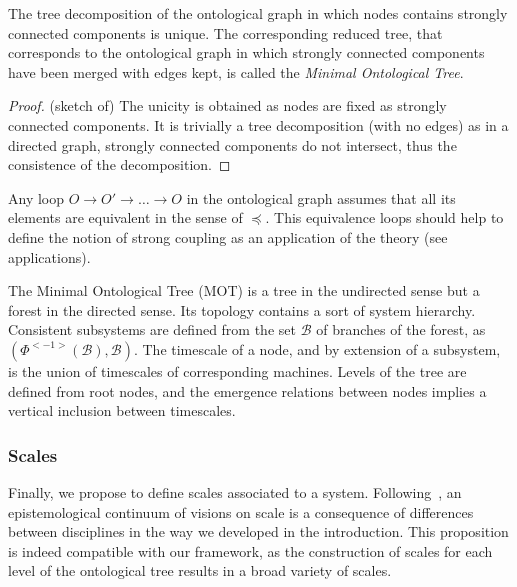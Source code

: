 \begin{proposition}
The tree decomposition of the ontological graph in which nodes contains strongly connected components is unique. The corresponding reduced tree, that corresponds to the ontological graph in which strongly connected components have been merged with edges kept, is called the \emph{Minimal Ontological Tree}.
\end{proposition}

\begin{proof}
(sketch of) The unicity is obtained as nodes are fixed as strongly connected components. It is trivially a tree decomposition (with no edges) as in a directed graph, strongly connected components do not intersect, thus the consistence of the decomposition.
\end{proof}

Any loop $O \rightarrow O' \rightarrow \ldots \rightarrow O$ in the ontological graph assumes that all its elements are equivalent in the sense of $\preccurlyeq$. This equivalence loops should help to define the notion of strong coupling as an application of the theory (see applications).

\medskip

The Minimal Ontological Tree (MOT) is a tree in the undirected sense but a forest in the directed sense. Its topology contains a sort of system hierarchy. Consistent subsystems are defined from the set $\mathcal{B}$ of branches of the forest, as $(\Phi^{<-1>}(\mathcal{B}),\mathcal{B})$. The timescale of a node, and by extension of a subsystem, is the union of timescales of corresponding machines. Levels of the tree are defined from root nodes, and the emergence relations between nodes implies a vertical inclusion between timescales.






\subsubsection*{Scales}

Finally, we propose to define scales associated to a system. Following~\cite{manson2008does}, an epistemological continuum of visions on scale is a consequence of differences between disciplines in the way we developed in the introduction. This proposition is indeed compatible with our framework, as the construction of scales for each level of the ontological tree results in a broad variety of scales.

